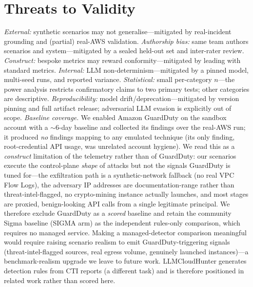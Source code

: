 \documentclass[journal]{IEEEtran}
\begin{document}
\section{Threats to Validity}\label{sec:threats}
\emph{External:} synthetic scenarios may not generalise---mitigated by real-incident
grounding and (partial) real-AWS validation. \emph{Authorship bias:} same team authors
scenarios and system---mitigated by a sealed held-out set and inter-rater review.
\emph{Construct:} bespoke metrics may reward conformity---mitigated by leading with
standard metrics. \emph{Internal:} LLM non-determinism---mitigated by a pinned model,
multi-seed runs, and reported variance. \emph{Statistical:} small per-category $n$---the
power analysis restricts confirmatory claims to two primary tests; other categories are
descriptive. \emph{Reproducibility:} model drift/deprecation---mitigated by version
pinning and full artifact release; adversarial LLM evasion is explicitly out of scope.
\emph{Baseline coverage.} We enabled Amazon GuardDuty on the sandbox account with a
$\sim$6-day baseline and collected its findings over the real-AWS run; it produced
\emph{no} findings mapping to any emulated technique (its only finding, root-credential
API usage, was unrelated account hygiene). We read this as a \emph{construct} limitation of
the telemetry rather than of GuardDuty: our scenarios execute the control-plane
\emph{shape} of attacks but not the signals GuardDuty is tuned for---the exfiltration path
is a synthetic-network fallback (no real VPC Flow Logs), the adversary IP addresses are
documentation-range rather than threat-intel-flagged, no crypto-mining instance actually
launches, and most stages are proxied, benign-looking API calls from a single legitimate
principal. We therefore exclude GuardDuty as a \emph{scored} baseline and retain the
community Sigma baseline (SIGMA arm) as the independent rules-only comparison, which
requires no managed service. Making a managed-detector comparison meaningful would require
raising scenario realism to emit GuardDuty-triggering signals (threat-intel-flagged
sources, real egress volume, genuinely launched instances)---a benchmark-realism upgrade we
leave to future work. LLMCloudHunter generates detection rules from CTI reports (a
different task) and is therefore positioned in related work rather than scored here.

\end{document}
